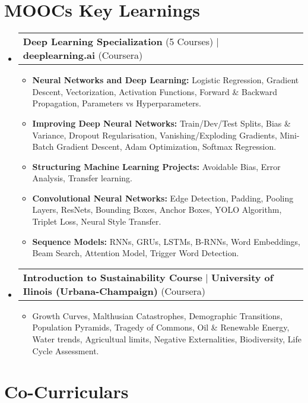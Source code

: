 \documentclass[letterpaper,11pt]{article}
\makeatletter
\newcommand{\resumeItem}[1]{
  \item\small{
    {#1 \vspace{-2pt}}
  }
}
\newcommand{\resumeProjectHeading}[2]{
    \item
    \begin{tabular*}{0.97\textwidth}{l@{\extracolsep{\fill}}r}
      \small#1 & #2 \\
    \end{tabular*}\vspace{-7pt}
}
\newcommand{\resumeSubHeadingListStart}{\begin{itemize}[leftmargin=0.15in, label={}]}
\newcommand{\resumeSubHeadingListEnd}{\end{itemize}}
\newcommand{\resumeItemListStart}{\begin{itemize}}
\newcommand{\resumeItemListEnd}{\end{itemize}\vspace{-5pt}}
\makeatother
\begin{document}
\section{MOOCs Key Learnings}
\smallskip

\resumeSubHeadingListStart
      \resumeProjectHeading
          {\textbf{Deep Learning Specialization} (5 Courses) $|$ {\textbf{deeplearning.ai} (Coursera)}}{}
          
          \resumeItemListStart
            \resumeItem{\textbf{Neural Networks and Deep Learning:} Logistic Regression, Gradient Descent, Vectorization, Activation Functions, Forward \& Backward Propagation, Parameters vs Hyperparameters.}
            \resumeItem{\textbf{Improving Deep Neural Networks: }Train/Dev/Test Splits, Bias \& Variance, Dropout Regularisation, Vanishing/Exploding Gradients, Mini-Batch Gradient Descent, Adam Optimization, Softmax Regression.}
            \resumeItem{\textbf{Structuring Machine Learning Projects:} Avoidable Bias, Error Analysis, Transfer learning.}
            \resumeItem{\textbf{Convolutional Neural Networks:} Edge Detection, Padding, Pooling Layers, ResNets, Bounding Boxes, Anchor Boxes, YOLO Algorithm, Triplet Loss, Neural Style Transfer.}
            \resumeItem{\textbf{Sequence Models:} RNNs, GRUs, LSTMs, B-RNNs, Word Embeddings, Beam Search, Attention Model, Trigger Word Detection.}
          \resumeItemListEnd
      \resumeProjectHeading
          {\textbf{Introduction to Sustainability Course} $|$ \textbf{University of Ilinois (Urbana-Champaign)} (Coursera)}{}
          \resumeItemListStart
            \resumeItem{Growth Curves, Malthusian Catastrophes, Demographic Transitions, Population Pyramids, Tragedy of Commons, Oil \& Renewable Energy, Water trends, Agricultual limits, Negative Externalities, Biodiversity, Life Cycle Assessment.}
          \resumeItemListEnd
    \resumeSubHeadingListEnd

    
\section{Co-Curriculars}
\end{document}
